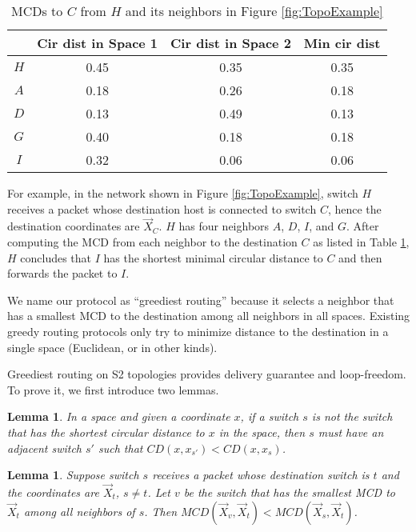 \documentclass[10pt,conference]{IEEEtran}
\newtheorem{lemma}[theorem]{Lemma}
\begin{document}
\begin{table}[t]
\centering
\small
\caption{MCDs to $C$ from $H$ and its neighbors in Figure \ref{fig:TopoExample}}
\vspace{-1ex}
\label{table:greediest_example}
\begin{tabular}{c||ccc}
\hline
 & Cir dist in Space 1 & Cir dist in Space 2 & Min cir dist \\
\hline
$H$ & 0.45 & 0.35 & 0.35 \\
$A$ & 0.18 & 0.26 & 0.18 \\
$D$ & 0.13 & 0.49 & 0.13 \\
$G$ & 0.40 & 0.18 & 0.18 \\
$I$ & 0.32 & 0.06 & 0.06 \\
 \hline
\end{tabular}
\vspace{-5ex}
\end{table}
For example, in the network shown in Figure \ref{fig:TopoExample},
switch $H$ receives a packet
whose destination host is connected to switch $C$, hence the destination coordinates are $\vec{X}_C$. $H$ has four neighbors $A$, $D$, $I$, and $G$. After computing the MCD from each neighbor to the destination $C$ as listed in Table \ref{table:greediest_example}, $H$ concludes that $I$ has the shortest minimal circular distance to $C$ and then forwards the packet to $I$.

We name our protocol as ``greediest routing'' because it selects a neighbor that has a smallest MCD  to the destination among all neighbors in all spaces.  Existing greedy routing protocols only try to minimize distance to the destination in a single space (Euclidean, or in other kinds).

Greediest routing on S2 topologies provides delivery guarantee and loop-freedom. To prove it, we first introduce two lemmas.
\begin{lemma}
\label{lemma1}
In a space and given a coordinate $x$, if a switch $s$ is not the switch that has the shortest circular distance to $x$ in the space, then $s$ must have an adjacent switch $s'$ such that $CD(x, x_{s'})< CD(x, x_s)$.
\end{lemma}

\begin{lemma}
\label{lemma2}
Suppose switch $s$ receives a packet whose destination switch is $t$ and the coordinates are  $\vec{X}_{t}$, $s \neq t$. Let $v$ be the switch that has the smallest MCD to $\vec{X}_{t}$ among all neighbors of $s$. Then $MCD(\vec{X}_v, \vec{X}_{t}) < MCD(\vec{X}_s, \vec{X}_{t})$.
\end{lemma}
\end{document}
